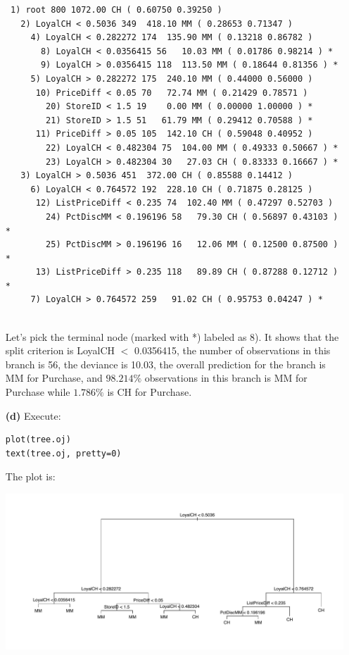 \documentclass[twoside,11pt]{homework}
\begin{document}
\begin{enumerate}
\begin{verbatim}
 1) root 800 1072.00 CH ( 0.60750 0.39250 )  
   2) LoyalCH < 0.5036 349  418.10 MM ( 0.28653 0.71347 )  
     4) LoyalCH < 0.282272 174  135.90 MM ( 0.13218 0.86782 )  
       8) LoyalCH < 0.0356415 56   10.03 MM ( 0.01786 0.98214 ) *
       9) LoyalCH > 0.0356415 118  113.50 MM ( 0.18644 0.81356 ) *
     5) LoyalCH > 0.282272 175  240.10 MM ( 0.44000 0.56000 )  
      10) PriceDiff < 0.05 70   72.74 MM ( 0.21429 0.78571 )  
        20) StoreID < 1.5 19    0.00 MM ( 0.00000 1.00000 ) *
        21) StoreID > 1.5 51   61.79 MM ( 0.29412 0.70588 ) *
      11) PriceDiff > 0.05 105  142.10 CH ( 0.59048 0.40952 )  
        22) LoyalCH < 0.482304 75  104.00 MM ( 0.49333 0.50667 ) *
        23) LoyalCH > 0.482304 30   27.03 CH ( 0.83333 0.16667 ) *
   3) LoyalCH > 0.5036 451  372.00 CH ( 0.85588 0.14412 )  
     6) LoyalCH < 0.764572 192  228.10 CH ( 0.71875 0.28125 )  
      12) ListPriceDiff < 0.235 74  102.40 MM ( 0.47297 0.52703 )  
        24) PctDiscMM < 0.196196 58   79.30 CH ( 0.56897 0.43103 ) *
        25) PctDiscMM > 0.196196 16   12.06 MM ( 0.12500 0.87500 ) *
      13) ListPriceDiff > 0.235 118   89.89 CH ( 0.87288 0.12712 ) *
     7) LoyalCH > 0.764572 259   91.02 CH ( 0.95753 0.04247 ) *
     
\end{verbatim}

Let's pick the terminal node (marked with *) labeled as 8). It shows that the split criterion is LoyalCH $<$ 0.0356415, the number of observations in this branch is 56, the deviance is 10.03, the overall prediction for the branch is MM for Purchase, and $98.214\%$ observations in this branch is MM for Purchase while $1.786\%$ is CH for Purchase.

\item[\textbf{(d)}] Execute:

\begin{lstlisting}
plot(tree.oj)
text(tree.oj, pretty=0)
\end{lstlisting}

The plot is:

\begin{center}
\includegraphics[height=0.31\textheight]{g1.pdf}
\end{center}


\end{enumerate}
\end{document}
